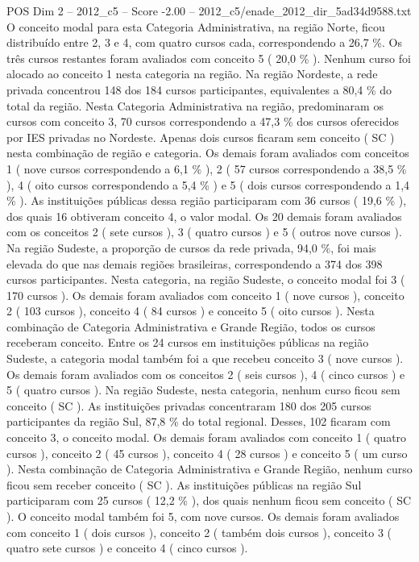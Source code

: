 \begin{textsample}{POS Dim 2 – 2012\_c5 – Score -2.00 – 2012\_c5/enade\_2012\_dir\_5ad34d9588.txt}
O conceito modal para esta Categoria Administrativa, na região Norte, ficou distribuído entre 2, 3 e 4, com quatro cursos cada, correspondendo a 26,7 \%.
Os três cursos restantes foram avaliados com conceito 5 ( 20,0 \% ).
Nenhum curso foi alocado ao conceito 1 nesta categoria na região.
Na região Nordeste, a rede privada concentrou 148 dos 184 cursos participantes, equivalentes a 80,4 \% do total da região.
Nesta Categoria Administrativa na região, predominaram os cursos com conceito 3, 70 cursos correspondendo a 47,3 \% dos cursos oferecidos por IES privadas no Nordeste.
Apenas dois cursos ficaram sem conceito ( SC ) nesta combinação de região e categoria.
Os demais foram avaliados com conceitos 1 ( nove cursos correspondendo a 6,1 \% ), 2 ( 57 cursos correspondendo a 38,5 \% ), 4 ( oito cursos correspondendo a 5,4 \% ) e 5 ( dois cursos correspondendo a 1,4 \% ).
As instituições públicas dessa região participaram com 36 cursos ( 19,6 \% ), dos quais 16 obtiveram conceito 4, o valor modal.
Os 20 demais foram avaliados com os conceitos 2 ( sete cursos ), 3 ( quatro cursos ) e 5 ( outros nove cursos ).
Na região Sudeste, a proporção de cursos da rede privada, 94,0 \%, foi mais elevada do que nas demais regiões brasileiras, correspondendo a 374 dos 398 cursos participantes.
Nesta categoria, na região Sudeste, o conceito modal foi 3 ( 170 cursos ).
Os demais foram avaliados com conceito 1 ( nove cursos ), conceito 2 ( 103 cursos ), conceito 4 ( 84 cursos ) e conceito 5 ( oito cursos ).
Nesta combinação de Categoria Administrativa e Grande Região, todos os cursos receberam conceito.
Entre os 24 cursos em instituições públicas na região Sudeste, a categoria modal também foi a que recebeu conceito 3 ( nove cursos ).
Os demais foram avaliados com os conceitos 2 ( seis cursos ), 4 ( cinco cursos ) e 5 ( quatro cursos ).
Na região Sudeste, nesta categoria, nenhum curso ficou sem conceito ( SC ).
As instituições privadas concentraram 180 dos 205 cursos participantes da região Sul, 87,8 \% do total regional.
Desses, 102 ficaram com conceito 3, o conceito modal.
Os demais foram avaliados com conceito 1 ( quatro cursos ), conceito 2 ( 45 cursos ), conceito 4 ( 28 cursos ) e conceito 5 ( um curso ).
Nesta combinação de Categoria Administrativa e Grande Região, nenhum curso ficou sem receber conceito ( SC ).
As instituições públicas na região Sul participaram com 25 cursos ( 12,2 \% ), dos quais nenhum ficou sem conceito ( SC ).
O conceito modal também foi 5, com nove cursos.
Os demais foram avaliados com conceito 1 ( dois cursos ), conceito 2 ( também dois cursos ), conceito 3 ( quatro sete cursos ) e conceito 4 ( cinco cursos ).

\end{textsample}
